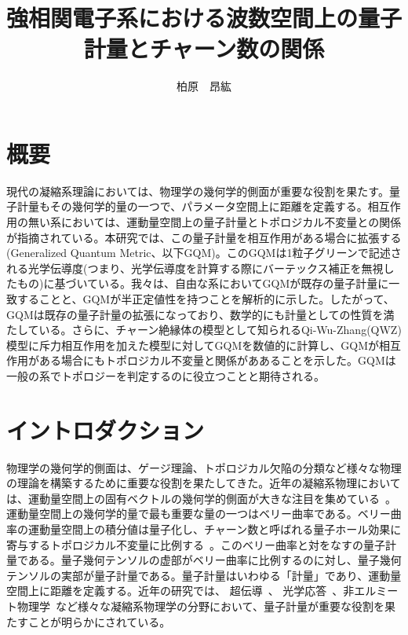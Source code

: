 \documentclass[12pt]{jsbook}
\begin{document}
\title{強相関電子系における波数空間上の量子計量とチャーン数の関係}

\author{柏原　昂紘 }

\maketitle
\frontmatter

\chapter*{概要}
現代の凝縮系理論においては、物理学の幾何学的側面が重要な役割を果たす。量子計量もその幾何学的量の一つで、パラメータ空間上に距離を定義する。相互作用の無い系においては、運動量空間上の量子計量とトポロジカル不変量との関係が指摘されている。本研究では、この量子計量を相互作用がある場合に拡張する(Generalized Quantum Metric、以下GQM)。このGQMは1粒子グリーンで記述される光学伝導度(つまり、光学伝導度を計算する際にバーテックス補正を無視したもの)に基づいている。我々は、自由な系においてGQMが既存の量子計量に一致することと、GQMが半正定値性を持つことを解析的に示した。したがって、GQMは既存の量子計量の拡張になっており、数学的にも計量としての性質を満たしている。さらに、チャーン絶縁体の模型として知られるQi-Wu-Zhang(QWZ)模型に斥力相互作用を加えた模型に対してGQMを数値的に計算し、GQMが相互作用がある場合にもトポロジカル不変量と関係がああることを示した。GQMは一般の系でトポロジーを判定するのに役立つことと期待される。

\tableofcontents

\mainmatter


\chapter{イントロダクション}
物理学の幾何学的側面は、ゲージ理論、トポロジカル欠陥の分類など\cite{nakahara2018geometry}様々な物理の理論を構築するために重要な役割を果たしてきた。近年の凝縮系物理においては、運動量空間上の固有ベクトルの幾何学的側面が大きな注目を集めている~\cite{bernevig2013topological,PhysRevX.9.041015,doi:10.1126/sciadv.1501524,Tokura2018,PhysRevLett.115.216806}。運動量空間上の幾何学的量で最も重要な量の一つはベリー曲率である。ベリー曲率の運動量空間上の積分値は量子化し、チャーン数と呼ばれる量子ホール効果に寄与するトポロジカル不変量に比例する~\cite{PhysRevLett.49.405}。このベリー曲率と対をなすの量子計量である。量子幾何テンソルの虚部がベリー曲率に比例するのに対し、量子幾何テンソルの実部が量子計量である\cite{shapere1989geometric}。量子計量はいわゆる「計量」であり、運動量空間上に距離を定義する。近年の研究では、 超伝導~\cite{Peotta2015,PhysRevLett.126.027002,PhysRevLett.128.087002,2022arXiv220900007H}、 光学応答~\cite{PhysRevB.94.134423,PhysRevB.104.134312,PhysRevResearch.4.013217}、非エルミート物理学~\cite{PhysRevLett.127.107402,PhysRevB.103.125302}など様々な凝縮系物理学の分野において、量子計量が重要な役割を果たすことが明らかにされている。
\end{document}

